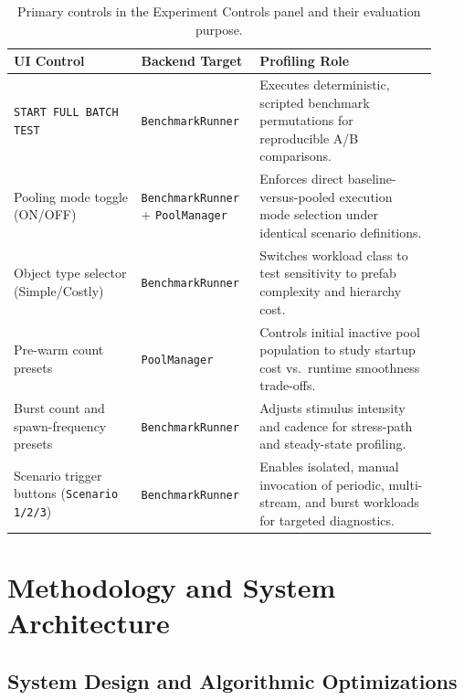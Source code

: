 \documentclass[11pt]{article}
\begin{document}
\begin{table}[htbp]
    \centering
    \caption{Primary controls in the Experiment Controls panel and their evaluation purpose.}
    \label{tab:ui_controls}
    \begin{tabular}{p{0.29\linewidth} p{0.24\linewidth} p{0.39\linewidth}}
        \toprule
        \textbf{UI Control} & \textbf{Backend Target} & \textbf{Profiling Role} \\
        \midrule
        \texttt{START FULL BATCH TEST} & \texttt{BenchmarkRunner} & Executes deterministic, scripted benchmark permutations for reproducible A/B comparisons. \\
        Pooling mode toggle (ON/OFF) & \texttt{BenchmarkRunner} + \texttt{PoolManager} & Enforces direct baseline-versus-pooled execution mode selection under identical scenario definitions. \\
        Object type selector (Simple/Costly) & \texttt{BenchmarkRunner} & Switches workload class to test sensitivity to prefab complexity and hierarchy cost. \\
        Pre-warm count presets & \texttt{PoolManager} & Controls initial inactive pool population to study startup cost vs.\ runtime smoothness trade-offs. \\
        Burst count and spawn-frequency presets & \texttt{BenchmarkRunner} & Adjusts stimulus intensity and cadence for stress-path and steady-state profiling. \\
        Scenario trigger buttons (\texttt{Scenario 1/2/3}) & \texttt{BenchmarkRunner} & Enables isolated, manual invocation of periodic, multi-stream, and burst workloads for targeted diagnostics. \\
        \bottomrule
    \end{tabular}
\end{table}

\section{Methodology and System Architecture}

\subsection{System Design and Algorithmic Optimizations}
\end{document}
